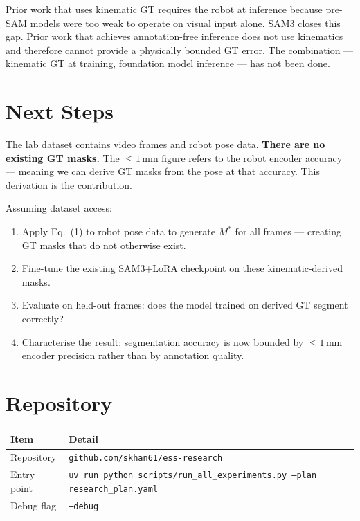 \documentclass[11pt, a4paper]{article}
\begin{document}
\noindent Prior work that uses kinematic GT \cite{rocha2019kinematic,ding2022carts}
requires the robot at inference because pre-SAM models were too weak to
operate on visual input alone. SAM3 closes this gap.
Prior work that achieves annotation-free inference \cite{sestini2025safis} does not use
kinematics and therefore cannot provide a physically bounded GT error.
The combination --- kinematic GT at training, foundation model inference ---
has not been done.

\section{Next Steps}

The lab dataset contains video frames and robot pose data.
\textbf{There are no existing GT masks.} The $\leq 1$\,mm figure refers
to the robot encoder accuracy --- meaning we can derive GT masks from
the pose at that accuracy. This derivation is the contribution.

Assuming dataset access:

\begin{enumerate}[noitemsep]
    \item Apply Eq.~(1) to robot pose data to generate $M^*$ for all
          frames --- creating GT masks that do not otherwise exist.
    \item Fine-tune the existing SAM3+LoRA checkpoint on these
          kinematic-derived masks.
    \item Evaluate on held-out frames: does the model trained on
          derived GT segment correctly?
    \item Characterise the result: segmentation accuracy is now
          bounded by $\leq 1$\,mm encoder precision rather than
          by annotation quality.
\end{enumerate}

\section{Repository}

\begin{center}
\begin{tabular}{ll}
\toprule
\textbf{Item} & \textbf{Detail} \\
\midrule
Repository   & \texttt{github.com/skhan61/ess-research} \\
Entry point  & \texttt{uv run python scripts/run\_all\_experiments.py --plan research\_plan.yaml} \\
Debug flag   & \texttt{--debug} \\
\bottomrule
\end{tabular}
\end{center}

\nocite{qin2020uw,hfrfnet2025,ravi2024sam2,yue2024surgicalsam,wu2024pointtracking,liu2024surgsam2}


\end{document}

